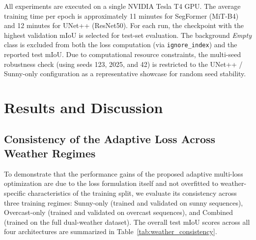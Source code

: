 \documentclass[journal,compsoc]{IEEEtran}
\begin{document}
All experiments are executed on a single NVIDIA Tesla T4 GPU. The average training time per epoch is approximately 11 minutes for SegFormer (MiT-B4) and 12 minutes for UNet++ (ResNet50). For each run, the checkpoint with the highest validation mIoU is selected for test-set evaluation. The background \textit{Empty} class is excluded from both the loss computation (via \texttt{ignore\_index}) and the reported test mIoU. Due to computational resource constraints, the multi-seed robustness check (using seeds 123, 2025, and 42) is restricted to the UNet++ / Sunny-only configuration as a representative showcase for random seed stability.


\section{Results and Discussion}
\label{sec:results}

\subsection{Consistency of the Adaptive Loss Across Weather Regimes}
\renewcommand{\arraystretch}{1.2} %
To demonstrate that the performance gains of the proposed adaptive multi-loss optimization are due to the loss formulation itself and not overfitted to weather-specific characteristics of the training split, we evaluate its consistency across three training regimes: Sunny-only (trained and validated on sunny sequences), Overcast-only (trained and validated on overcast sequences), and Combined (trained on the full dual-weather dataset). The overall test mIoU scores across all four architectures are summarized in Table~\ref{tab:weather_consistency}.
\end{document}
